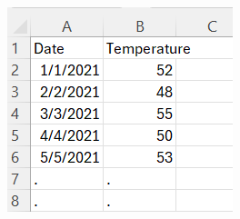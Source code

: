 \documentclass{article}
\begin{document}
\begin{enumerate}
		\begin{flushright}
			\includegraphics[scale=.65]{imgs/DailyTemperaturesData.PNG}
		\end{flushright}




\end{enumerate}
\pagebreak
\end{document}
